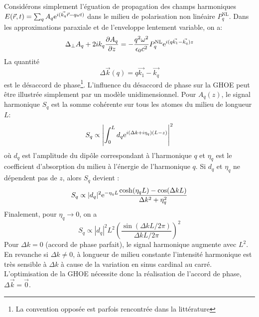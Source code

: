 Considérons simplement l'éguation de propagation des champs harmoniques $E(\vec{r},t) = \sum_q A_q \mathrm{e}^{i(\vec{k_q} \vec{r} - q\omega t)}$ dans le milieu de polarisation non linéaire $P_q^{\text{NL}}$. Dans les approximations paraxiale et de l'enveloppe lentement variable, on a:
\begin{equation}
\Delta_\bot A_q + 2 i k_q \frac{\partial A_q}{\partial z}= -\frac{q^2 \omega^2}{\epsilon_0 c^2} P_q^{\text{NL}} \mathrm{e}^{i(q \vec{k_1} - \vec{k_q})z}
\end{equation} 
La quantité
\begin{equation}
\Delta \vec{k} (q) = q \vec{k_1} - \vec{k_q}
\end{equation}
est le désaccord de phase\footnote{La convention opposée est parfois rencontrée dans la littérature}. L'influence du désaccord de phase sur la GHOE peut être illustrée simplement par un modèle unidimensionnel. Pour $A_q(z)$, le signal harmonique $S_q$ est la somme cohérente sur tous les atomes du milieu de longueur $L$:
\begin{equation}
S_q \propto \left| \int_0^L d_q \mathrm{e}^{i(\Delta k + i \eta_q)(L-z)} \right|^2
\end{equation}
où $d_q$ est l'amplitude du dipôle correspondant à l'harmonique $q$ et $\eta_q$ est le coefficient d'absorption du milieu à l'énergie de l'harmonique $q$. Si $d_q$ et $\eta_q$ ne dépendent pas de $z$, alors $S_q$ devient :
\begin{equation}
S_q \propto |d_q|^2 \mathrm{e}^{-\eta_q L} \frac{\cosh(\eta_q L) - \cos(\Delta k L)}{\Delta k^2 + \eta_q^2}
\end{equation}
Finalement, pour $\eta_q \rightarrow 0$, on a
\begin{equation}
S_q \propto |d_q|^2 L^2 \left( \frac{\sin(\Delta k L /2\pi)}{\Delta k L /2\pi}\right)^2
\end{equation}
Pour $\Delta k = 0$ (accord de phase parfait), le signal harmonique augmente avec $L^2$. En revanche si $\Delta k \neq 0$, à longueur de milieu constante l'intensité harmonique est très sensible à $\Delta k$ à cause de la variation en sinus cardinal au carré. L'optimisation de la GHOE nécessite donc la réalisation de l'accord de phase, $\Delta \vec{k} = \vec{0}$.

